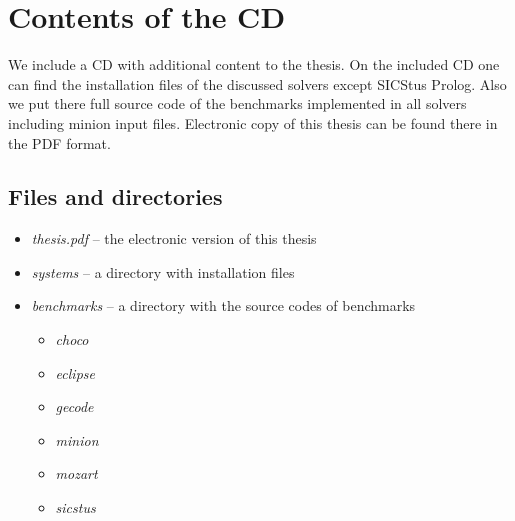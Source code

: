 \chapter{Contents of the CD}
\label{cdcontents}

We include a CD with additional content to the thesis. On the included CD one can 
find the installation files of the discussed solvers except SICStus Prolog. Also we 
put there full source code of the benchmarks implemented in all solvers including minion input files.
Electronic copy of this thesis can be found there in the PDF format.

\section{Files and directories}
\begin{itemize}
  \item {\em thesis.pdf} -- the electronic version of this thesis
  \item {\em systems} -- a directory with installation files
  \item {\em benchmarks} -- a directory with the source codes of benchmarks
  \begin{itemize}
    \item {\em choco} 
    \item {\em eclipse}
    \item {\em gecode}
    \item {\em minion}
    \item {\em mozart}
    \item {\em sicstus}
  \end{itemize}
    
\end{itemize}
  
